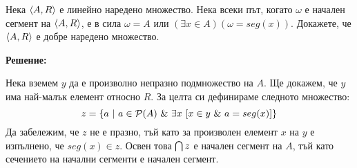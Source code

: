 \begin{problem}
Нека $\langle A, R \rangle$ е линейно наредено множество.
Нека всеки път, когато $\omega$ е начален сегмент на $\langle A, R \rangle$, е в сила
$\omega = A$ или $(\exists x \in A)(\omega = seg(x))$.
Докажете, че $\langle A, R \rangle$ е добре наредено множество.
\end{problem}

\textbf{Решение:}

\smallbreak
\quad
Нека вземем $y$ да е произволно непразно подмножество на $A$.
Ще докажем, че $y$ има най-малък елемент относно $R$.
За целта си дефинираме следното множество:
\[
z = \{ a\ |\ a \in \mathcal{P}(A) \ \&\  \exists x\ [ x \in y \ \&\   a = seg(x)] \}
\]
\quad
Да забележим, че $z$ не е празно, тъй като за произволен елемент $x$ на $y$ е изпълнено, че $seg(x) \in z$.
Освен това $\bigcap z$ е начален сегмент на $A$, тъй като сечението на начални сегменти е начален сегмент.

